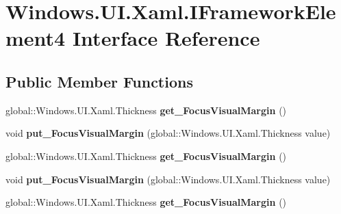 \hypertarget{interface_windows_1_1_u_i_1_1_xaml_1_1_i_framework_element4}{}\section{Windows.\+U\+I.\+Xaml.\+I\+Framework\+Element4 Interface Reference}
\label{interface_windows_1_1_u_i_1_1_xaml_1_1_i_framework_element4}
\subsection*{Public Member Functions}
\begin{DoxyCompactItemize}
\item 
\mbox{\label{interface_windows_1_1_u_i_1_1_xaml_1_1_i_framework_element4_adf34a86a4339f6776906c515ed1588ee}} 
global\+::\+Windows.\+U\+I.\+Xaml.\+Thickness {\bfseries get\+\_\+\+Focus\+Visual\+Margin} ()
\item 
\mbox{\label{interface_windows_1_1_u_i_1_1_xaml_1_1_i_framework_element4_ad74eefb3c93e1c409adfedeb3a033b87}} 
void {\bfseries put\+\_\+\+Focus\+Visual\+Margin} (global\+::\+Windows.\+U\+I.\+Xaml.\+Thickness value)
\item 
\mbox{\label{interface_windows_1_1_u_i_1_1_xaml_1_1_i_framework_element4_adf34a86a4339f6776906c515ed1588ee}} 
global\+::\+Windows.\+U\+I.\+Xaml.\+Thickness {\bfseries get\+\_\+\+Focus\+Visual\+Margin} ()
\item 
\mbox{\label{interface_windows_1_1_u_i_1_1_xaml_1_1_i_framework_element4_ad74eefb3c93e1c409adfedeb3a033b87}} 
void {\bfseries put\+\_\+\+Focus\+Visual\+Margin} (global\+::\+Windows.\+U\+I.\+Xaml.\+Thickness value)
\item 
\mbox{\label{interface_windows_1_1_u_i_1_1_xaml_1_1_i_framework_element4_adf34a86a4339f6776906c515ed1588ee}} 
global\+::\+Windows.\+U\+I.\+Xaml.\+Thickness {\bfseries get\+\_\+\+Focus\+Visual\+Margin} ()
\item 

\end{DoxyCompactItemize}
